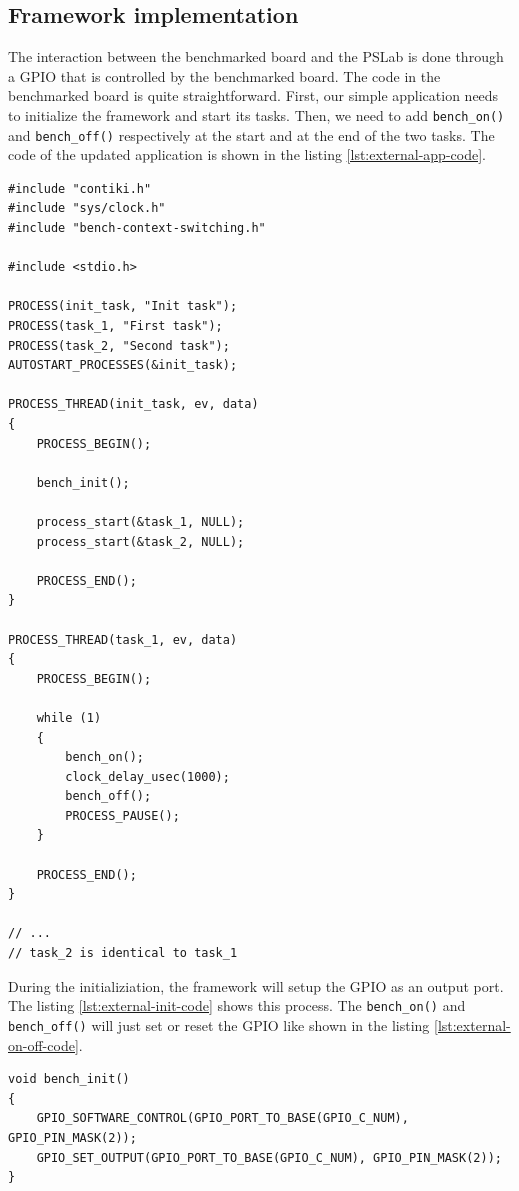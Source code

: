 \subsection{Framework implementation}

The interaction between the benchmarked board and the PSLab is done through a GPIO that is controlled by the benchmarked board.
The code in the benchmarked board is quite straightforward.
First, our simple application needs to initialize the framework and start its tasks.
Then, we need to add \texttt{bench\_on()} and \texttt{bench\_off()} respectively at the start and at the end of the two tasks.
The code of the updated application is shown in the listing \ref{lst:external-app-code}.

\begin{lstlisting}[style=CStyle, float, caption={Source code of the simple application in Contiki}, label={lst:external-app-code}]
#include "contiki.h"
#include "sys/clock.h"
#include "bench-context-switching.h"

#include <stdio.h>

PROCESS(init_task, "Init task");
PROCESS(task_1, "First task");
PROCESS(task_2, "Second task");
AUTOSTART_PROCESSES(&init_task);

PROCESS_THREAD(init_task, ev, data)
{
    PROCESS_BEGIN();

    bench_init();

    process_start(&task_1, NULL);
    process_start(&task_2, NULL);

    PROCESS_END();
}

PROCESS_THREAD(task_1, ev, data)
{
    PROCESS_BEGIN();

    while (1)
    {
        bench_on();
        clock_delay_usec(1000);
        bench_off();
        PROCESS_PAUSE();
    }

    PROCESS_END();
}

// ...
// task_2 is identical to task_1
\end{lstlisting}

During the initializiation, the framework will setup the GPIO as an output port. 
The listing \ref{lst:external-init-code} shows this process.
The \texttt{bench\_on()} and \texttt{bench\_off()} will just set or reset the GPIO like shown in the listing \ref{lst:external-on-off-code}.

\begin{lstlisting}[style=CStyle, caption={Initializiation of the framework in Contiki}, label={lst:external-init-code}]
void bench_init()
{
    GPIO_SOFTWARE_CONTROL(GPIO_PORT_TO_BASE(GPIO_C_NUM), GPIO_PIN_MASK(2));
    GPIO_SET_OUTPUT(GPIO_PORT_TO_BASE(GPIO_C_NUM), GPIO_PIN_MASK(2));
}
\end{lstlisting}

